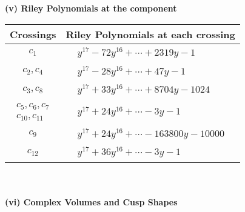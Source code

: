 \documentclass[1p]{elsarticle_modified}
\theoremstyle{definition}
\begin{document}
\newpage\renewcommand{\arraystretch}{1}
\flushleft \textbf{(v) Riley Polynomials at the component}\newline \\
\begin{tabular}{m{50pt}|m{274pt}}
Crossings & \hspace{64pt}Riley Polynomials at each crossing \\
\hline $$\begin{aligned}c_{1}\end{aligned}$$&$\begin{aligned}
&y^{17}-72 y^{16}+\cdots+2319 y-1
\end{aligned}$\\
\hline $$\begin{aligned}c_{2},c_{4}\end{aligned}$$&$\begin{aligned}
&y^{17}-28 y^{16}+\cdots+47 y-1
\end{aligned}$\\
\hline $$\begin{aligned}c_{3},c_{8}\end{aligned}$$&$\begin{aligned}
&y^{17}+33 y^{16}+\cdots+8704 y-1024
\end{aligned}$\\
\hline $$\begin{aligned}c_{5},c_{6},c_{7}\\c_{10},c_{11}\end{aligned}$$&$\begin{aligned}
&y^{17}+24 y^{16}+\cdots-3 y-1
\end{aligned}$\\
\hline $$\begin{aligned}c_{9}\end{aligned}$$&$\begin{aligned}
&y^{17}+24 y^{16}+\cdots-163800 y-10000
\end{aligned}$\\
\hline $$\begin{aligned}c_{12}\end{aligned}$$&$\begin{aligned}
&y^{17}+36 y^{16}+\cdots-3 y-1
\end{aligned}$\\
\hline
\end{tabular}\\~\\
\newpage\flushleft \textbf{(vi) Complex Volumes and Cusp Shapes}
\end{document}
